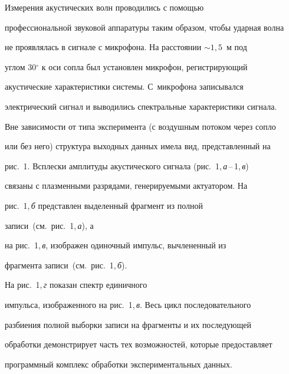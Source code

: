      Измерения акустических волн проводились с помощью 


профессиональной звуковой аппаратуры таким образом, чтобы ударная волна 


не проявлялась в сигнале с микрофона. На расстоянии $\sim1{,}5$~м под 


углом 30$^\circ$ к оси сопла был установлен микрофон, регистрирующий 


акустические характеристики системы. С~микрофона записывался 


электрический сигнал и выводились спектральные характеристики сигнала. 


Вне зависимости от типа эксперимента (с воздушным потоком через сопло 


или без него) структура выходных данных имела вид, представленный на 


рис.~1. Всплески амплитуды акустического сигнала (рис.~1,\,\textit{а}\,--\,1,\,\textit{в}) 


связаны с плазменными разрядами, генерируемыми актуатором. На 


рис.~1,\,\textit{б} представлен выделенный фрагмент из полной 


записи~(см.\ рис.~1,\,\textit{а}), а 


на рис.~1,\,\textit{в}, изображен одиночный импульс, вычлененный из 


фрагмента записи~(см.\ рис.~1,\,\textit{б}). 


На рис.~1,\,\textit{г} показан спектр единичного 


импульса, изображенного на рис.~1,\,\textit{в}. Весь цикл последовательного 


разбиения полной выборки записи на фрагменты и их последующей 


обработки демонстрирует часть тех возможностей, которые предоставляет 


программный комплекс обработки экспериментальных данных.


     



